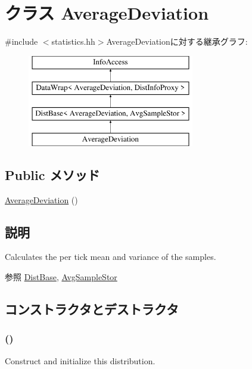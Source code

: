 \hypertarget{classStats_1_1AverageDeviation}{
\section{クラス AverageDeviation}
\label{classStats_1_1AverageDeviation}
}


{\ttfamily \#include $<$statistics.hh$>$}AverageDeviationに対する継承グラフ:\begin{figure}[H]
\begin{center}
\leavevmode
\includegraphics[height=4cm]{classStats_1_1AverageDeviation}
\end{center}
\end{figure}
\subsection*{Public メソッド}
\begin{DoxyCompactItemize}
\item 
\hyperlink{classStats_1_1AverageDeviation_a4adc4487eb40b9037050e6c203af8e09}{AverageDeviation} ()
\end{DoxyCompactItemize}


\subsection{説明}
Calculates the per tick mean and variance of the samples. \begin{DoxySeeAlso}{参照}
\hyperlink{classStats_1_1DistBase}{DistBase}, \hyperlink{classStats_1_1AvgSampleStor}{AvgSampleStor} 
\end{DoxySeeAlso}


\subsection{コンストラクタとデストラクタ}
\hypertarget{classStats_1_1AverageDeviation_a4adc4487eb40b9037050e6c203af8e09}{
\subsubsection[{AverageDeviation}]{ ()}}
\label{classStats_1_1AverageDeviation_a4adc4487eb40b9037050e6c203af8e09}
Construct and initialize this distribution. 


